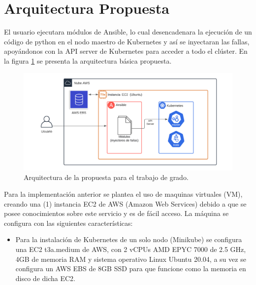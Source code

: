 
\section{Arquitectura Propuesta}

\par El usuario ejecutara módulos de Ansible, lo cual
desencadenara la ejecución de un código de python en el nodo maestro de Kubernetes y así se inyectaran las fallas, apoyándonos con la API server de Kubernetes para acceder a todo el clúster. En la figura \ref{fig:arq02} se presenta la arquitectura básica propuesta.
\begin{figure}[htpb!]
	\centering
	\includegraphics[width=0.95\columnwidth]{images/arq02.png}
	\caption{Arquitectura de la propuesta para el trabajo de grado.}
	\label{fig:arq02}
\end{figure}

\par Para la implementación anterior se plantea el uso de maquinas virtuales (VM), creando %
una (1) instancia EC2 de AWS (Amazon Web Services) debido a que se posee conocimientos sobre este servicio y es de fácil acceso. La m\'aquina se configura con las siguientes características:

\begin{itemize}
    \item Para la instalación de Kubernetes de un solo nodo (Minikube) se configura una EC2 t3a.medium de AWS, con 2 vCPUs AMD EPYC 7000 de 2.5 GHz, 4GB de memoria RAM y sistema operativo Linux Ubuntu 20.04, a su vez se configura un AWS EBS de 8GB SSD para que funcione como la memoria en disco de dicha EC2.
\end{itemize}

